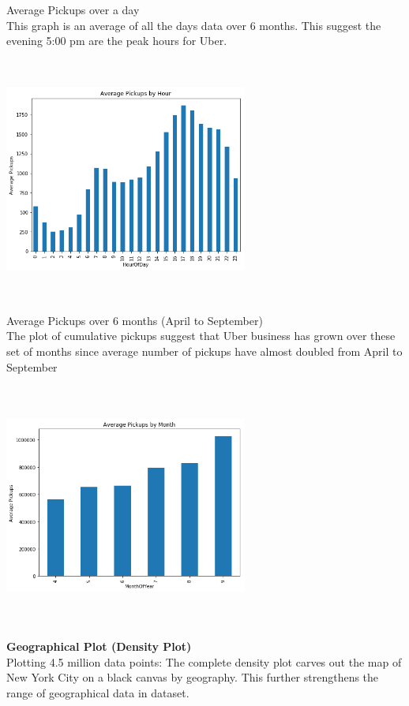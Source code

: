 \documentclass[12pt]{article}
\begin{document}
Average Pickups over a day \\
	This graph is an average of all the days data over 6 months. This suggest the evening 5:00 pm are the peak hours for Uber.

\includegraphics[width=8cm, height=8cm]{ByHour.png}	

Average Pickups over 6 months (April to September) \\
	The plot of cumulative pickups suggest that Uber business has grown over these set of months since average number of pickups have almost doubled from April to September

\includegraphics[width=8cm, height=8cm]{ByMonth.png}	

\textbf{Geographical Plot (Density Plot)}  \\

Plotting 4.5 million data points:
The complete density plot carves out the map of New York City on a black canvas by geography. This further strengthens the range of geographical data in dataset.
\end{document}
